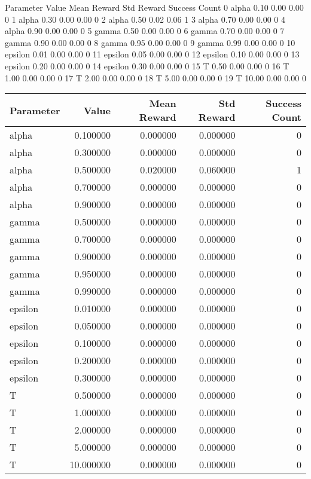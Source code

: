 \documentclass{article}
\begin{document}
Parameter  Value  Mean Reward  Std Reward  Success Count
0      alpha   0.10         0.00        0.00              0
1      alpha   0.30         0.00        0.00              0
2      alpha   0.50         0.02        0.06              1
3      alpha   0.70         0.00        0.00              0
4      alpha   0.90         0.00        0.00              0
5      gamma   0.50         0.00        0.00              0
6      gamma   0.70         0.00        0.00              0
7      gamma   0.90         0.00        0.00              0
8      gamma   0.95         0.00        0.00              0
9      gamma   0.99         0.00        0.00              0
10   epsilon   0.01         0.00        0.00              0
11   epsilon   0.05         0.00        0.00              0
12   epsilon   0.10         0.00        0.00              0
13   epsilon   0.20         0.00        0.00              0
14   epsilon   0.30         0.00        0.00              0
15         T   0.50         0.00        0.00              0
16         T   1.00         0.00        0.00              0
17         T   2.00         0.00        0.00              0
18         T   5.00         0.00        0.00              0
19         T  10.00         0.00        0.00              0
\begin{tabular}{lrrrr}
\toprule
Parameter & Value & Mean Reward & Std Reward & Success Count \\
\midrule
alpha & 0.100000 & 0.000000 & 0.000000 & 0 \\
alpha & 0.300000 & 0.000000 & 0.000000 & 0 \\
alpha & 0.500000 & 0.020000 & 0.060000 & 1 \\
alpha & 0.700000 & 0.000000 & 0.000000 & 0 \\
alpha & 0.900000 & 0.000000 & 0.000000 & 0 \\
gamma & 0.500000 & 0.000000 & 0.000000 & 0 \\
gamma & 0.700000 & 0.000000 & 0.000000 & 0 \\
gamma & 0.900000 & 0.000000 & 0.000000 & 0 \\
gamma & 0.950000 & 0.000000 & 0.000000 & 0 \\
gamma & 0.990000 & 0.000000 & 0.000000 & 0 \\
epsilon & 0.010000 & 0.000000 & 0.000000 & 0 \\
epsilon & 0.050000 & 0.000000 & 0.000000 & 0 \\
epsilon & 0.100000 & 0.000000 & 0.000000 & 0 \\
epsilon & 0.200000 & 0.000000 & 0.000000 & 0 \\
epsilon & 0.300000 & 0.000000 & 0.000000 & 0 \\
T & 0.500000 & 0.000000 & 0.000000 & 0 \\
T & 1.000000 & 0.000000 & 0.000000 & 0 \\
T & 2.000000 & 0.000000 & 0.000000 & 0 \\
T & 5.000000 & 0.000000 & 0.000000 & 0 \\
T & 10.000000 & 0.000000 & 0.000000 & 0 \\
\bottomrule
\end{tabular}
\end{document}
